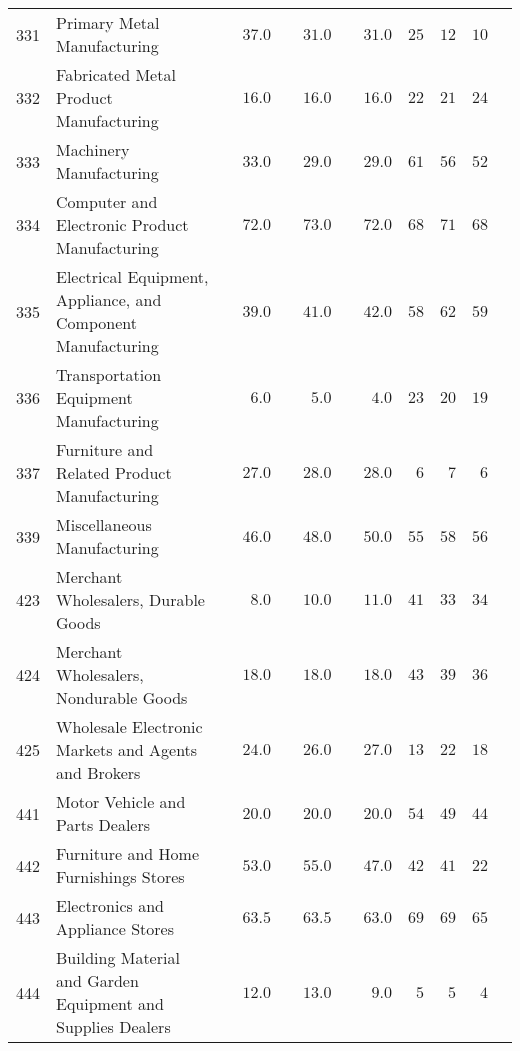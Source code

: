 \documentclass[9pt, oneside]{article}   	%
\begin{document}
\begin{longtable}{lp{3 in}ccccccc}
331  & Primary Metal Manufacturing & $\phantom{00}37.0$ & $\phantom{00}31.0$ & $\phantom{00}31.0$ & $25$ & $12$ & $10$ \\
332  & Fabricated Metal Product Manufacturing & $\phantom{00}16.0$ & $\phantom{00}16.0$ & $\phantom{00}16.0$ & $22$ & $21$ & $24$ \\
333  & Machinery Manufacturing & $\phantom{00}33.0$ & $\phantom{00}29.0$ & $\phantom{00}29.0$ & $61$ & $56$ & $52$ \\
334  & Computer and Electronic Product Manufacturing & $\phantom{00}72.0$ & $\phantom{00}73.0$ & $\phantom{00}72.0$ & $68$ & $71$ & $68$ \\
335  & Electrical Equipment, Appliance, and Component Manufacturing & $\phantom{00}39.0$ & $\phantom{00}41.0$ & $\phantom{00}42.0$ & $58$ & $62$ & $59$ \\
336  & Transportation Equipment Manufacturing & $\phantom{000}6.0$ & $\phantom{000}5.0$ & $\phantom{000}4.0$ & $23$ & $20$ & $19$ \\
337  & Furniture and Related Product Manufacturing & $\phantom{00}27.0$ & $\phantom{00}28.0$ & $\phantom{00}28.0$ & $\phantom{0}6$ & $\phantom{0}7$ & $\phantom{0}6$ \\
339  & Miscellaneous Manufacturing & $\phantom{00}46.0$ & $\phantom{00}48.0$ & $\phantom{00}50.0$ & $55$ & $58$ & $56$ \\
423  & Merchant Wholesalers, Durable Goods & $\phantom{000}8.0$ & $\phantom{00}10.0$ & $\phantom{00}11.0$ & $41$ & $33$ & $34$ \\
424  & Merchant Wholesalers, Nondurable Goods & $\phantom{00}18.0$ & $\phantom{00}18.0$ & $\phantom{00}18.0$ & $43$ & $39$ & $36$ \\
425  & Wholesale Electronic Markets and Agents and Brokers & $\phantom{00}24.0$ & $\phantom{00}26.0$ & $\phantom{00}27.0$ & $13$ & $22$ & $18$ \\
441  & Motor Vehicle and Parts Dealers & $\phantom{00}20.0$ & $\phantom{00}20.0$ & $\phantom{00}20.0$ & $54$ & $49$ & $44$ \\
442  & Furniture and Home Furnishings Stores & $\phantom{00}53.0$ & $\phantom{00}55.0$ & $\phantom{00}47.0$ & $42$ & $41$ & $22$ \\
443  & Electronics and Appliance Stores & $\phantom{00}63.5$ & $\phantom{00}63.5$ & $\phantom{00}63.0$ & $69$ & $69$ & $65$ \\
444  & Building Material and Garden Equipment and Supplies Dealers & $\phantom{00}12.0$ & $\phantom{00}13.0$ & $\phantom{000}9.0$ & $\phantom{0}5$ & $\phantom{0}5$ & $\phantom{0}4$ \\

\end{longtable}
\end{document}
